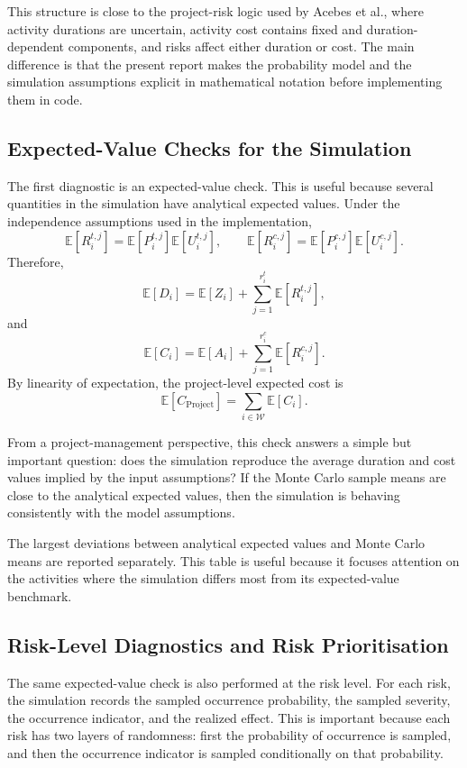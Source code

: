 \documentclass[11pt,a4paper]{article}
\providecommand{\E}{\mathbb{E}}
\newcommand{\cW}{\mathcal{W}}
\newcommand{\E}{\mathbb{E}}
\newcommand{\1}{\mathbf{1}}
\theoremstyle{definition}
\theoremstyle{plain}
\theoremstyle{remark}
\numberwithin{equation}{section}
\begin{document}
This structure is close to the project-risk logic used by Acebes et al., where activity durations are uncertain, activity cost contains fixed and duration-dependent components, and risks affect either duration or cost. The main difference is that the present report makes the probability model and the simulation assumptions explicit in mathematical notation before implementing them in code.

\subsection{Expected-Value Checks for the Simulation}

The first diagnostic is an expected-value check. This is useful because several quantities in the simulation have analytical expected values. Under the independence assumptions used in the implementation,
\[
\E[R_i^{t,j}]
=
\E[P_i^{t,j}]\E[U_i^{t,j}],
\qquad
\E[R_i^{c,j}]
=
\E[P_i^{c,j}]\E[U_i^{c,j}].
\]
Therefore,
\[
\E[D_i]
=
\E[Z_i]+\sum_{j=1}^{r_i^t}\E[R_i^{t,j}],
\]
and
\[
\E[C_i]
=
\E[A_i]+\sum_{j=1}^{r_i^c}\E[R_i^{c,j}].
\]
By linearity of expectation, the project-level expected cost is
\[
\E[C_{\text{Project}}]
=
\sum_{i\in\cW}\E[C_i].
\]

From a project-management perspective, this check answers a simple but important question: does the simulation reproduce the average duration and cost values implied by the input assumptions? If the Monte Carlo sample means are close to the analytical expected values, then the simulation is behaving consistently with the model assumptions.



The largest deviations between analytical expected values and Monte Carlo means are reported separately. This table is useful because it focuses attention on the activities where the simulation differs most from its expected-value benchmark.



\subsection{Risk-Level Diagnostics and Risk Prioritisation}

The same expected-value check is also performed at the risk level. For each risk, the simulation records the sampled occurrence probability, the sampled severity, the occurrence indicator, and the realized effect. This is important because each risk has two layers of randomness: first the probability of occurrence is sampled, and then the occurrence indicator is sampled conditionally on that probability.
\end{document}

